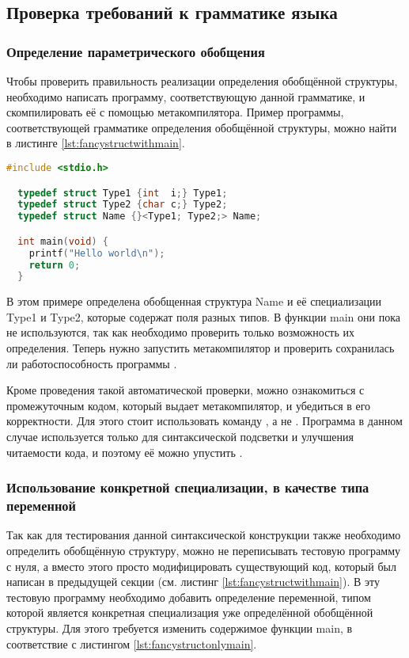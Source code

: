 \subsection{Проверка требований к грамматике языка}
\subsubsection{Определение параметрического обобщения}
Чтобы проверить правильность реализации определения обобщённой структуры, необходимо написать программу, соответствующую данной грамматике, и скомпилировать её с помощью метакомпилятора.
Пример программы, соответствующей грамматике определения обобщённой структуры, можно найти в листинге \ref{lst:fancystructwithmain}.

\begin{lstlisting}[language=c, caption={Пример программы с обобщённой структурой}, label={lst:fancystructwithmain}]
  #include <stdio.h>

  typedef struct Type1 {int  i;} Type1;
  typedef struct Type2 {char c;} Type2;
  typedef struct Name {}<Type1; Type2;> Name;

  int main(void) {
    printf("Hello world\n");
    return 0;
  }
\end{lstlisting}

В этом примере определена обобщенная структура Name и её специализации Type1 и Type2, которые содержат поля разных типов.
В функции main они пока не используются, так как необходимо проверить только возможность их определения.
Теперь нужно запустить метакомпилятор и проверить сохранилась ли работоспособность программы
.

Кроме проведения такой автоматической проверки, можно ознакомиться с промежуточным кодом, который выдает метакомпилятор, и убедиться в его корректности.
Для этого стоит использовать команду , а не .
Программа  в данном случае используется только для синтаксической подсветки и улучшения читаемости кода, и поэтому её можно упустить .

\subsubsection{Использование конкретной специализации, в качестве типа переменной}
Так как для тестирования данной синтаксической конструкции также необходимо определить обобщённую структуру,
можно не переписывать тестовую программу с нуля, а вместо этого просто модифицировать существующий код,
который был написан в предыдущей секции (см. листинг \ref{lst:fancystructwithmain}).
В эту тестовую программу необходимо добавить определение переменной,
типом которой является конкретная специализация уже определённой обобщённой структуры.
Для этого требуется изменить содержимое функции main, в соответствие с листингом \ref{lst:fancystructonlymain}.


